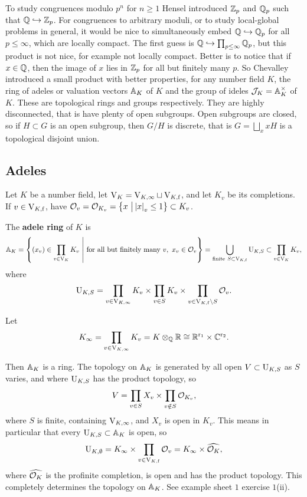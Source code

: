 To study congruences modulo $ p^n $ for $ n \ge 1 $ Hensel introduced $ \ZZ_p $ and $ \QQ_p $ such that $ \QQ \hookrightarrow \ZZ_p $. For congruences to arbitrary moduli, or to study local-global problems in general, it would be nice to simultaneously embed $ \QQ \hookrightarrow \QQ_p $ for all $ p \le \infty $, which are locally compact. The first guess is $ \QQ \hookrightarrow \prod_{p \le \infty} \QQ_p $, but this product is not nice, for example not locally compact. Better is to notice that if $ x \in \QQ $, then the image of $ x $ lies in $ \ZZ_p $ for all but finitely many $ p $. So Chevalley introduced a small product with better properties, for any number field $ K $, the ring of adeles or valuation vectors $ \AA_K $ of $ K $ and the group of ideles $ \JJJ_K = \AA_K^\times $ of $ K $. These are topological rings and groups respectively. They are highly disconnected, that is have plenty of open subgroups. Open subgroups are closed, so if $ H \subset G $ is an open subgroup, then $ G / H $ is discrete, that is $ G = \bigsqcup_x xH $ is a topological disjoint union.

\subsection{Adeles}

Let $ K $ be a number field, let $ \V_K = \V_{K, \infty} \sqcup \V_{K, \f} $, and let $ K_v $ be its completions. If $ v \in \V_{K, \f} $, have $ \OOO_v = \OOO_{K_v} = \cbr{x \st \abs{x}_v \le 1} \subset K_v $.

\begin{definition*}
The \textbf{adele ring} of $ K $ is
$$ \AA_K = \cbr{\br{x_v} \in \prod_{v \in \V_K} K_v \st \text{for all but finitely many} \ v, \ x_v \in \OOO_v} = \bigcup_{\text{finite} \ S \subset \V_{K, \f}} \U_{K, S} \subset \prod_{v \in \V_K} K_v, $$
where
$$ \U_{K, S} = \prod_{v \in \V_{K, \infty}} K_v \times \prod_{v \in S} K_v \times \prod_{v \in \V_{K, \f} \setminus S} \OOO_v. $$
\end{definition*}

\begin{notation*}
Let
$$ K_\infty = \prod_{v \in \V_{K, \infty}} K_v = K \otimes_\QQ \RR \cong \RR^{\r_1} \times \CC^{\r_2}. $$
\end{notation*}

Then $ \AA_K $ is a ring. The topology on $ \AA_K $ is generated by all open $ V \subset \U_{K, S} $ as $ S $ varies, and where $ \U_{K, S} $ has the product topology, so
$$ V = \prod_{v \in S} X_v \times \prod_{v \notin S} \OOO_{K_v}, $$
where $ S $ is finite, containing $ \V_{K, \infty} $, and $ X_v $ is open in $ K_v $. This means in particular that every $ \U_{K, S} \subset \AA_K $ is open, so
$$ \U_{K, \emptyset} = K_\infty \times \prod_{v \in \V_{K, \f}} \OOO_v = K_\infty \times \widehat{\OOO_K}, $$
where $ \widehat{\OOO_K} $ is the profinite completion, is open and has the product topology. This completely determines the topology on $ \AA_K $. See example sheet $ 1 $ exercise $ 1 $(ii).

